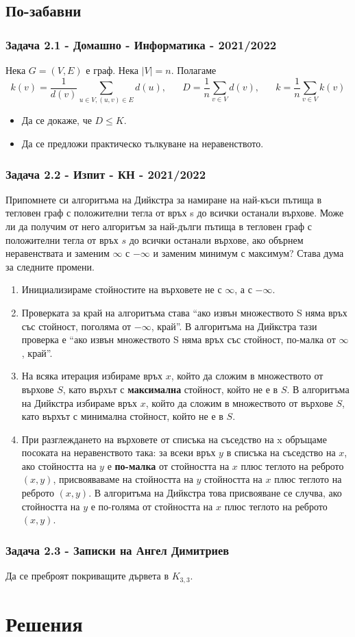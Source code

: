 \documentclass[12pt]{article}
\begin{document}
\subsection*{По-забавни}
\subsubsection*{Задача 2.1 - Домашно - Информатика - 2021/2022}
Нека $G = (V, E)$ е граф. Нека $|V| = n$. Полагаме
\begin{equation*}
    k(v) = \frac{1}{d(v)} \displaystyle\sum_{u \in V, (u, v) \in E} d(u), \; \; \; \; \; \; D = \frac{1}{n}\displaystyle\sum_{v \in V} d(v), \; \; \; \; \; \; k = \frac{1}{n}\displaystyle\sum_{v \in V} k(v) 
\end{equation*}
\begin{itemize}
    \item Да се докаже, че $D \leq K$.
    \item Да се предложи практическо тълкуване на неравенството.
\end{itemize}

\subsubsection*{Задача 2.2 - Изпит - КН - 2021/2022}
Припомнете си алгоритъма на Дийкстра за намиране на най-къси пътища в тегловен граф с положителни тегла от връх s до всички останали върхове. Може ли да получим от него алгоритъм за най-дълги пътища в тегловен граф с положителни тегла от връх $s$ до всички останали върхове, ако обърнем неравенствата и заменим $\infty$ с $-\infty$ и заменим минимум с максимум? Става дума за следните промени.
\begin{enumerate}
    \item Инициализираме стойностите на върховете не с $\infty$, а с $-\infty$.
    \item Проверката за край на алгоритъма става ``ако извън множеството S няма връх със стойност, поголяма от $-\infty$, край''. В алгоритъма на Дийкстра тази проверка е ``ако извън множеството S няма връх със стойност, по-малка от $\infty$, край''.
    \item На всяка итерация избираме връх $x$, който да сложим в множеството от върхове $S$, като върхът с \textbf{максимална} стойност, който не е в $S$. В алгоритъма на Дийкстра избираме връх $x$, който да сложим в множеството от върхове $S$, като върхът с минимална стойност, който не е в $S$.
    \item При разглеждането на върховете от списъка на съседство на x обръщаме посоката на неравенството така: за всеки връх $y$ в списъка на съседство на $x$, ако стойността на $y$ е \textbf{по-малка} от стойността на $x$ плюс теглото на реброто $(x, y)$, присвояваваме на стойността на $y$ стойността на $x$ плюс теглото на реброто $(x, y)$. В алгоритъма на Дийкстра това присвояване се случва, ако стойността на $y$ е по-голяма от стойността на $x$ плюс теглото на реброто $(x, y)$.
\end{enumerate}
\subsubsection*{Задача 2.3 - Записки на Ангел Димитриев}
Да се преброят покриващите дървета в $K_{3, 3}$.

\section*{Решения}
\end{document}
